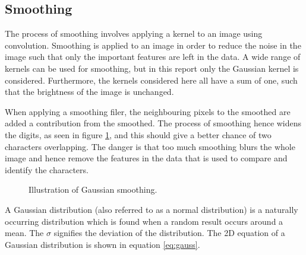 \subsection{Smoothing}
The process of smoothing involves applying a kernel to an image using convolution.
Smoothing is applied to an image in order to reduce the noise in the image such that only the important features are left in the data.
A wide range of kernels can be used for smoothing, but in this report only the Gaussian kernel is considered.
Furthermore, the kernels considered here all have a sum of one, such that the brightness of the image is unchanged.


When applying a smoothing filer, the neighbouring pixels to the smoothed are added a contribution from the smoothed.
The process of smoothing hence widens the digits, as seen in figure \ref{fig:effect_smooth}, and this should give a better chance of two characters overlapping.
The danger is that too much smoothing blurs the whole image and hence remove the features in the data that is used to compare and identify the characters.

\begin{figure}[H]
\centering
	\begin{subfigure}[b]{0.45\textwidth}
	\end{subfigure}
	\qquad
	\begin{subfigure}[b]{0.45\textwidth}
	\end{subfigure}
	\begin{subfigure}[b]{0.45\textwidth}
	\end{subfigure}
	\qquad
	\begin{subfigure}[b]{0.45\textwidth}
	\end{subfigure}
\caption{Illustration of Gaussian smoothing.}
\label{fig:effect_smooth}
\end{figure}



A Gaussian distribution (also referred to as a normal distribution) is a naturally occurring distribution which is found when a random result occurs around a mean. 
The $\sigma$ signifies the deviation of the distribution. 
The 2D equation of a Gaussian distribution is shown in equation \ref{eq:gauss}. 

